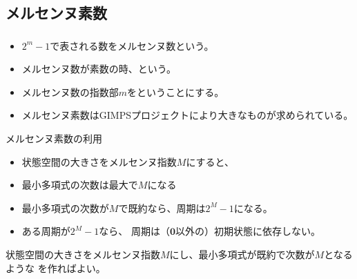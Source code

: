 \documentclass[cjk, dvips, handout, trans, xcolor=dvipsnames]{beamer}
\begin{document}
\subsection{メルセンヌ素数}
\begin{frame}[t]
  \frametitle{\insertsubsection}
  \begin{itemize}
  \item $2^m-1$で表される数をメルセンヌ数という。
  \item メルセンヌ数が素数の時、という。
  \item メルセンヌ数の指数部$m$をということにする。
  \item メルセンヌ素数はGIMPSプロジェクトにより大きなものが求められている。
  \end{itemize}

  \pause
  \begin{block}{メルセンヌ素数の利用}
    \begin{itemize}
    \item[] 状態空間の大きさをメルセンヌ指数$M$にすると、
    \item 最小多項式の次数は最大で$M$になる
    \item 最小多項式の次数が$M$で既約なら、周期は$2^M-1$になる。
    \item ある周期が$2^M-1$なら、
      周期は（$\mathbf{0}$以外の）初期状態に依存しない。
    \end{itemize}
    状態空間の大きさをメルセンヌ指数$M$にし、最小多項式が既約で次数が$M$となるような
    \FLPRNG を作ればよい。
  \end{block}
\end{frame}
\end{document}
